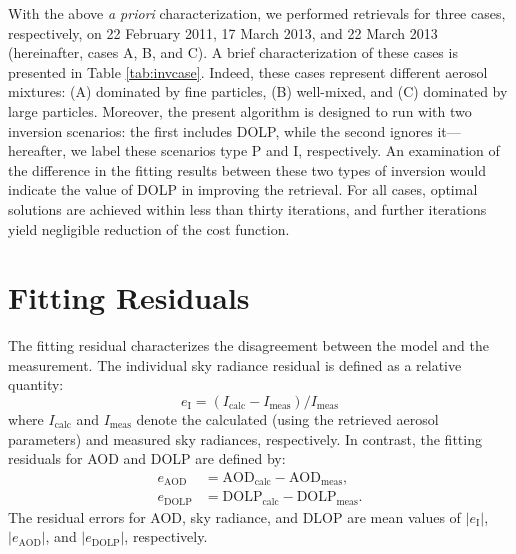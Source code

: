 With the above \textit{a priori} characterization, we performed retrievals for three
cases, respectively, on 22 February 2011, 17 March 2013, and 22 March 2013
(hereinafter, cases A, B, and C). A brief characterization of these cases is
presented in Table \ref{tab:invcase}. Indeed, these cases represent different 
aerosol mixtures: (A) dominated by fine particles, (B) well-mixed, and (C) 
dominated by large particles. Moreover, the present algorithm is designed to 
run with two inversion scenarios: the first includes DOLP, while the second ignores
it---hereafter, we label these scenarios type P and I, respectively. An
examination of the difference in the fitting results between these two types of
inversion would indicate the value of DOLP in improving the retrieval. For all
cases, optimal solutions are achieved within less than thirty iterations, and
further iterations yield negligible reduction of the cost function. 

\section{Fitting Residuals} \label{sec:invfit}

The fitting residual characterizes the disagreement between the model and the
measurement. The individual sky radiance residual is defined as a relative
quantity: 
\begin{equation}
e_\text{I}=(I_\text{calc}-I_\text{meas})/I_\text{meas}
\end{equation}
where $I_\text{calc}$ and $I_\text{meas}$ denote the calculated (using the 
retrieved aerosol parameters) and measured sky radiances, respectively. 
In contrast, the fitting residuals for AOD and DOLP are defined by: 
\begin{align}
e_\text{AOD} &= \text{AOD}_\text{calc}-\text{AOD}_\text{meas}, \\
e_\text{DOLP} &= \text{DOLP}_\text{calc}-\text{DOLP}_\text{meas}.
\end{align}
The residual errors for AOD, sky radiance, and DLOP are mean values of
$|e_\text{I}|$, $|e_\text{AOD}|$, and $|e_\text{DOLP}|$, respectively.

